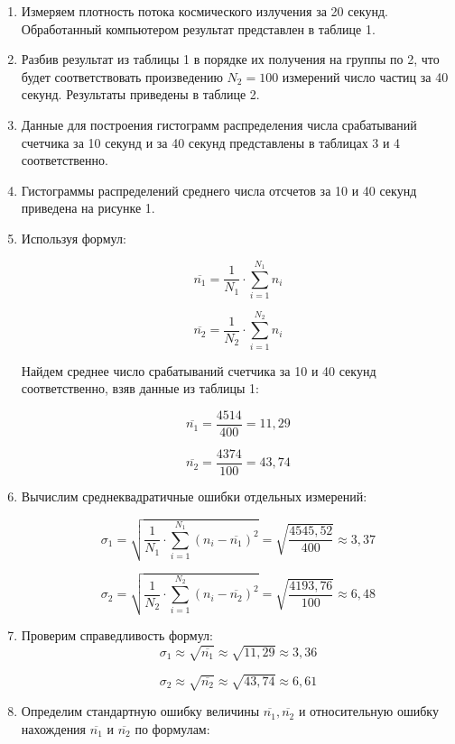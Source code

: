 \documentclass[a4paper, 12pt]{article} %
\begin{document}
\begin{enumerate}

\item
Измеряем плотность потока космического излучения за 20 секунд. Обработанный компьютером результат представлен в таблице 1.

\item
Разбив результат из таблицы 1 в порядке их получения на группы по 2, что будет соответствовать произведению \(N_2=100\) измерений число частиц за 40 секунд. Результаты приведены в таблице 2.

\item
Данные для построения гистограмм распределения числа срабатываний счетчика за 10 секунд и за 40 секунд представлены в таблицах 3 и 4 соответственно.

\item
Гистограммы распределений среднего числа отсчетов за 10 и 40 секунд приведена на рисунке 1.

\item
Используя формул:

\[ \overline{n_1}=\frac{1}{N_1}\cdot\sum\limits_{i=1}^{N_1}n_i\]

\[ \overline{n_2}=\frac{1}{N_2}\cdot\sum\limits_{i=1}^{N_2}n_i\]

Найдем среднее число срабатываний счетчика за 10 и 40 секунд соответственно, взяв данные из таблицы 1:

\[ \overline{n_1}=\frac{4514}{400}=11,29\]

\[ \overline{n_2}=\frac{4374}{100}=43,74\]

\item
Вычислим среднеквадратичные ошибки отдельных измерений:

\[ \sigma_1=\sqrt{\frac{1}{N_1}\cdot\sum\limits_{i=1}^{N_1}(n_i-\overline{n_1})^2}=\sqrt{\frac{4545,52}{400}}\approx 3,37\]

\[ \sigma_2=\sqrt{\frac{1}{N_2}\cdot\sum\limits_{i=1}^{N_2}(n_i-\overline{n_2})^2}=\sqrt{\frac{4193,76}{100}}\approx 6,48 \]

\item
Проверим справедливость формул:
\[ \sigma_1\approx \sqrt{\overline{n_1}} \approx \sqrt{11,29}  \approx 3,36\]

\[ \sigma_2\approx \sqrt{\overline{n_2}} \approx \sqrt{43,74}  \approx 6,61\]

\item
Определим стандартную ошибку величины \( \overline{n_1}, \overline{n_2}\) и относительную ошибку нахождения \( \overline{n_1} \) и \( \overline{n_2}\) по формулам:


\end{enumerate}
\end{document}

